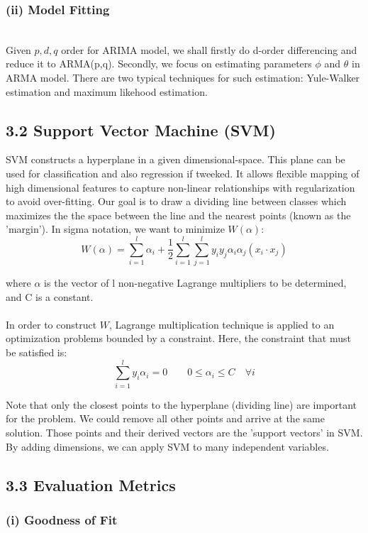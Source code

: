 \documentclass[letterpaper]{article} %
\begin{document}
\subsubsection*{(ii) Model Fitting}~\\
Given $p,d,q$ order for ARIMA model, we shall firstly do d-order differencing and reduce it to ARMA(p,q). Secondly, we focus on estimating parameters $\phi$ and $\theta$ in ARMA model. There are two typical techniques for such estimation: Yule-Walker estimation and maximum likehood estimation.

\subsection*{3.2 Support Vector Machine (SVM)}

SVM constructs a hyperplane in a given dimensional-space. This plane can be used for classification and also regression if tweeked. It allows flexible mapping of high dimensional features to capture non-linear relationships with regularization to avoid over-fitting. Our goal is to draw a dividing line between classes which maximizes the the space between the line and the nearest points (known as the 'margin'). In sigma notation, we want to minimize $W(\alpha)$:
$$ W(\alpha) = \sum_{i=1}^l \alpha_i +
    \frac{1}{2} \sum_{i=1}^l \sum_{j=1}^l y_i y_j \alpha_i \alpha_j (x_i \cdot  x_j) $$

\noindent
where $\alpha$ is the vector of l non-negative Lagrange multipliers to be determined, and C is a constant. \\ \\ In order to construct $W$, Lagrange multiplication technique is applied to an optimization problems bounded by a constraint. Here, the constraint that must be satisfied is:
$$ \sum_{i=1}^l y_i \alpha_i = 0 \qquad 0 \le \alpha_i \le C \quad \forall i$$

\noindent
Note that only the closest points to the hyperplane (dividing line) are important for the problem. We could remove all other points and arrive at the same solution. Those points and their derived vectors are the 'support vectors' in SVM. By adding dimensions, we can apply SVM to many independent variables.


\subsection*{3.3 Evaluation Metrics}

\subsubsection*{(i) Goodness of Fit}~\\
\end{document}
